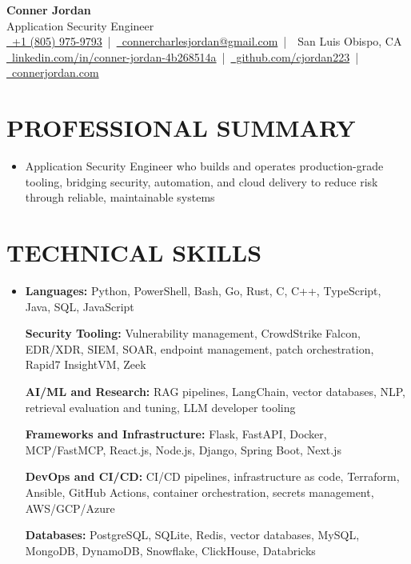 \documentclass[letterpaper,10pt]{article}
\newcommand{\resumeSubHeadingListStart}{\begin{itemize}[leftmargin=0in,label={}]}
\newcommand{\resumeSubHeadingListEnd}{\end{itemize}}
\begin{document}
\begin{center}
  {\Huge \textbf{Conner Jordan}}\\[0pt]
  {\Large Application Security Engineer}\\[0pt]
  \href{tel:+18059759793}{\faPhone\ +1 (805) 975-9793} \,|\, 
  \href{mailto:connercharlesjordan@gmail.com}{\faEnvelope\ connercharlesjordan@gmail.com} \,|\, 
  \faMapMarker\ San Luis Obispo, CA \\[-2pt]
  \href{https://www.linkedin.com/in/conner-jordan-4b268514a/}{\faLinkedin\ linkedin.com/in/conner-jordan-4b268514a}
  \,|\, \href{https://github.com/cjordan223}{\faGithub\ github.com/cjordan223}
  \,|\, \href{https://connerjordan.com/}{\faGlobe\ connerjordan.com}
\end{center}

\vspace{4pt}

\section{PROFESSIONAL SUMMARY}
\vspace{8pt}
\resumeSubHeadingListStart
\item {\small
Application Security Engineer who builds and operates production-grade tooling, bridging security, automation, and cloud delivery to reduce risk through reliable, maintainable systems}
\resumeSubHeadingListEnd
\vspace{6pt}

\section{TECHNICAL SKILLS}
\vspace{6pt}
\resumeSubHeadingListStart
\item {\small
\textbf{Languages:} Python, PowerShell, Bash, Go, Rust, C, C++, TypeScript, Java, SQL, JavaScript

\vspace{3pt}
\textbf{Security Tooling:} Vulnerability management, CrowdStrike Falcon, EDR/XDR, SIEM, SOAR, endpoint management, patch orchestration, Rapid7 InsightVM, Zeek

\vspace{3pt}
\textbf{AI/ML and Research:} RAG pipelines, LangChain, vector databases, NLP, retrieval evaluation and tuning, LLM developer tooling

\vspace{3pt}
\textbf{Frameworks and Infrastructure:} Flask, FastAPI, Docker, MCP/FastMCP, React.js, Node.js, Django, Spring Boot, Next.js

\vspace{3pt}
\textbf{DevOps and CI/CD:} CI/CD pipelines, infrastructure as code, Terraform, Ansible, GitHub Actions, container orchestration, secrets management, AWS/GCP/Azure

\vspace{3pt}
\textbf{Databases:} PostgreSQL, SQLite, Redis, vector databases, MySQL, MongoDB, DynamoDB, Snowflake, ClickHouse, Databricks
}
\resumeSubHeadingListEnd
\vspace{6pt}
\end{document}
